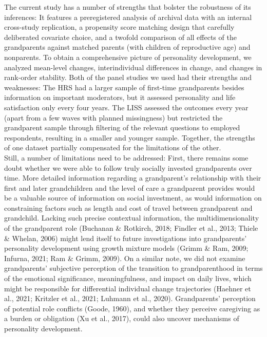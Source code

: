 \documentclass[
  english,
  man,floatsintext]{apa7}
\begin{document}
The current study has a number of strengths that bolster the robustness of its inferences: It features a preregistered analysis of archival data with an internal cross-study replication, a propensity score matching design that carefully deliberated covariate choice, and a twofold comparison of all effects of the grandparents against matched parents (with children of reproductive age) and nonparents. To obtain a comprehensive picture of personality development, we analyzed mean-level changes, interindividual differences in change, and changes in rank-order stability. Both of the panel studies we used had their strengths and weaknesses: The HRS had a larger sample of first-time grandparents besides information on important moderators, but it assessed personality and life satisfaction only every four years. The LISS assessed the outcomes every year (apart from a few waves with planned missingness) but restricted the grandparent sample through filtering of the relevant questions to employed respondents, resulting in a smaller and younger sample. Together, the strengths of one dataset partially compensated for the limitations of the other.\\
Still, a number of limitations need to be addressed: First, there remains some doubt whether we were able to follow truly socially invested grandparents over time. More detailed information regarding a grandparent's relationship with their first and later grandchildren and the level of care a grandparent provides would be a valuable source of information on social investment, as would information on constraining factors such as length and cost of travel between grandparent and grandchild. Lacking such precise contextual information, the multidimensionality of the grandparent role (Buchanan \& Rotkirch, 2018; Findler et al., 2013; Thiele \& Whelan, 2006) might lend itself to future investigations into grandparents' personality development using growth mixture models (Grimm \& Ram, 2009; Infurna, 2021; Ram \& Grimm, 2009). On a similar note, we did not examine grandparents' subjective perception of the transition to grandparenthood in terms of the emotional significance, meaningfulness, and impact on daily lives, which might be responsible for differential individual change trajectories (Haehner et al., 2021; Kritzler et al., 2021; Luhmann et al., 2020). Grandparents' perception of potential role conflicts (Goode, 1960), and whether they perceive caregiving as a burden or obligation (Xu et al., 2017), could also uncover mechanisms of personality development.\\
\end{document}
